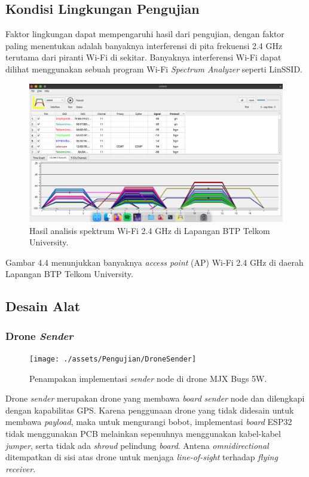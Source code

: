 \subsection{Kondisi Lingkungan Pengujian}
Faktor lingkungan dapat mempengaruhi hasil dari pengujian, dengan faktor paling menentukan adalah banyaknya interferensi di pita frekuensi 2.4 GHz terutama dari piranti Wi-Fi di sekitar. Banyaknya interferensi Wi-Fi dapat dilihat menggunakan sebuah program Wi-Fi \textit{Spectrum Analyzer} seperti LinSSID.
\begin{figure}[H]
	\centering
	\includegraphics[scale=0.25]{./assets/InterferensiLapanganBTP}
	\caption{Hasil analisis spektrum Wi-Fi 2.4 GHz di Lapangan BTP Telkom University.}
\end{figure}
Gambar 4.4 menunjukkan banyaknya \textit{access point} (AP) Wi-Fi 2.4 GHz di daerah Lapangan BTP Telkom University.
\subsection{Desain Alat}
\subsubsection{Drone \textit{Sender}}
\begin{figure}[H]
	\centering
	\texttt{[image: ./assets/Pengujian/DroneSender]}
	\caption{Penampakan implementasi \textit{sender} node di drone MJX Bugs 5W.}
\end{figure}
Drone \textit{sender} merupakan drone yang membawa \textit{board} \textit{sender} node dan dilengkapi dengan kapabilitas GPS. Karena penggunaan drone yang tidak didesain untuk membawa \textit{payload}, maka untuk mengurangi bobot, implementasi \textit{board} ESP32 tidak menggunakan PCB melainkan sepenuhnya menggunakan kabel-kabel \textit{jumper}, serta tidak ada \textit{shroud} pelindung \textit{board}. Antena \textit{omnidirectional} ditempatkan di sisi atas drone untuk menjaga \textit{line-of-sight} terhadap \textit{flying receiver}.
